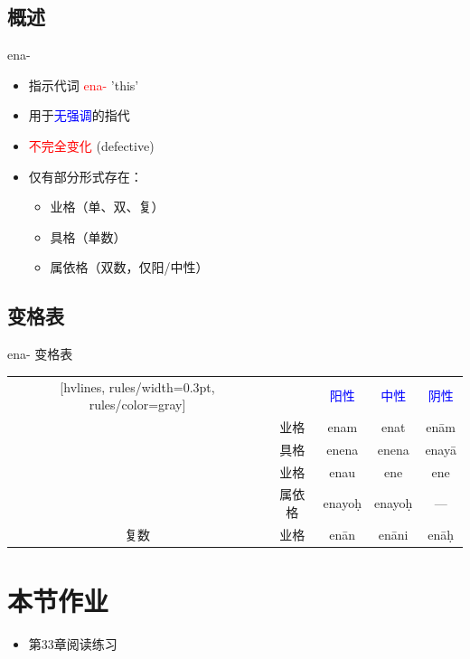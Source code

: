 \documentclass[17pt]{beamer}
\newcommand{\nounstem}[1]{\textcolor{red}{#1\nobreakdash-}}
\newcommand{\fullpada}[1]{\textcolor{OliveGreen}{#1}}
\newcommand{\veryimportant}[1]{\textcolor{red}{#1}}
\newcommand{\important}[1]{\textcolor{blue}{#1}}
\begin{document}
\subsection{概述}
\begin{frame}{ena- \insertsubsection}
  \small
  \begin{itemize}
    \item 指示代词 \nounstem{ena} 'this'
    \item 用于\important{无强调}的指代
    \item \veryimportant{不完全变化} (defective)\\
    \item 仅有部分形式存在：
    \begin{itemize}
      \item 业格（单、双、复）
      \item 具格（单数）
      \item 属依格（双数，仅阳/中性）
    \end{itemize}
  \end{itemize}
\end{frame}

\subsection{变格表}
\begin{frame}{ena- 变格表}
  \centering
    \begin{NiceTabular}{|c|c|c|c|c|}[hvlines, rules/width=0.3pt, rules/color=gray]
      & & \important{阳性} & \important{中性} & \important{阴性} \\
       & 业格 & \fullpada{enam} & \fullpada{enat} & \fullpada{enām} \\
      & 具格 & \fullpada{enena} & \fullpada{enena} & \fullpada{enayā} \\
       & 业格 & \fullpada{enau} & \fullpada{ene} & \fullpada{ene} \\
      & 属依格 & \fullpada{enayoḥ} & \fullpada{enayoḥ} & — \\
      复数 & 业格 & \fullpada{enān} & \fullpada{enāni} & \fullpada{enāḥ} \\
    \end{NiceTabular}
\end{frame}


\section{本节作业}

\begin{frame}{\insertsection}
  \begin{itemize}
    \item 第33章阅读练习
  \end{itemize}
\end{frame}
\end{document}
